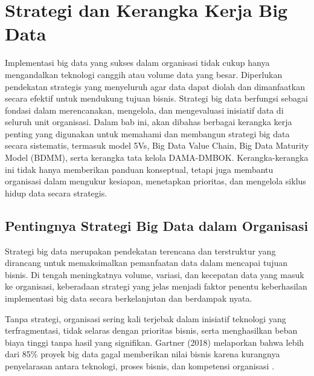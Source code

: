 \chapter{Strategi dan Kerangka Kerja Big Data}

\noindent
Implementasi big data yang sukses dalam organisasi tidak cukup hanya mengandalkan teknologi canggih atau volume data yang besar. Diperlukan pendekatan strategis yang menyeluruh agar data dapat diolah dan dimanfaatkan secara efektif untuk mendukung tujuan bisnis. Strategi big data berfungsi sebagai fondasi dalam merencanakan, mengelola, dan mengevaluasi inisiatif data di seluruh unit organisasi. Dalam bab ini, akan dibahas berbagai kerangka kerja penting yang digunakan untuk memahami dan membangun strategi big data secara sistematis, termasuk model 5Vs, Big Data Value Chain, Big Data Maturity Model (BDMM), serta kerangka tata kelola DAMA-DMBOK. Kerangka-kerangka ini tidak hanya memberikan panduan konseptual, tetapi juga membantu organisasi dalam mengukur kesiapan, menetapkan prioritas, dan mengelola siklus hidup data secara strategis.


\section{Pentingnya Strategi Big Data dalam Organisasi}

Strategi big data merupakan pendekatan terencana dan terstruktur yang dirancang untuk memaksimalkan pemanfaatan data dalam mencapai tujuan bisnis. Di tengah meningkatnya volume, variasi, dan kecepatan data yang masuk ke organisasi, keberadaan strategi yang jelas menjadi faktor penentu keberhasilan implementasi big data secara berkelanjutan dan berdampak nyata.

Tanpa strategi, organisasi sering kali terjebak dalam inisiatif teknologi yang terfragmentasi, tidak selaras dengan prioritas bisnis, serta menghasilkan beban biaya tinggi tanpa hasil yang signifikan. Gartner (2018) melaporkan bahwa lebih dari 85\% proyek big data gagal memberikan nilai bisnis karena kurangnya penyelarasan antara teknologi, proses bisnis, dan kompetensi organisasi \cite{gartner2018}.

